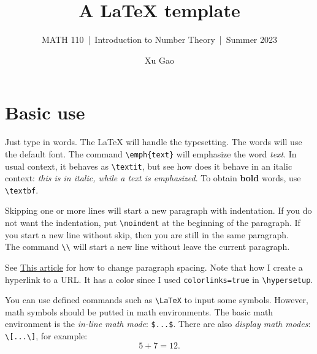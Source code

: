 \documentclass[11pt]{article}
\title{A {\LaTeX} template}
\author{Xu Gao}
\subtitle{MATH 110~|~Introduction to Number Theory~|~Summer 2023}
\theoremstyle{plain}
\theoremstyle{definition}
\theoremstyle{remark}
\numberwithin{equation}{problem}
\begin{document}
\maketitle

\section{Basic use}
Just type in words. The {\LaTeX} will handle the typesetting. 
The words will use the default font. 
The command \verb|\emph{text}| will emphasize the word \emph{text}. 
In usual context, it behaves as \verb|\textit|, but see how does it behave in an italic context: \textit{this is in italic, while a \emph{text} is emphasized}. 
To obtain \textbf{bold} words, use \verb|\textbf|. 

Skipping one or more lines will start a new paragraph with indentation. 
If you do not want the indentation, put \verb|\noindent| at the beginning of the paragraph. 
If you start a new line without skip, then you are still in the same paragraph. \\
The command \verb|\\| will start a new line without leave the current paragraph. 

See \href{https://www.overleaf.com/learn/latex/Articles/How_to_change_paragraph_spacing_in_LaTeX}{This article} for how to change paragraph spacing. Note that how I create a hyperlink to a URL. It has a color since I used \verb|colorlinks=true| in \verb|\hypersetup|.

You can use defined commands such as \verb|\LaTeX| to input some symbols. 
However, math symbols should be putted in math environments. 
The basic math environment is the \emph{in-line math mode}: \verb|$...$|. There are also \emph{display math modes}: \verb|\[...\]|, for example:
\[
	5+7=12.
\] 
\end{document}
